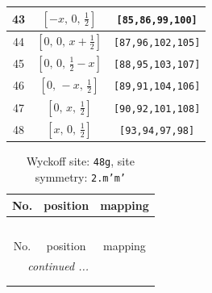 \documentclass[fleqn,8pt]{jsarticle}
\begin{document}
\begin{longtable}{ccc}
43 & $\left[ - x,\, 0,\, \frac{1}{2} \right]$ & {\tt [85,86,99,100]} \\ \hline
44 & $\left[ 0,\, 0,\, x + \frac{1}{2} \right]$ & {\tt [87,96,102,105]} \\ \hline
45 & $\left[ 0,\, 0,\, \frac{1}{2} - x \right]$ & {\tt [88,95,103,107]} \\ \hline
46 & $\left[ 0,\, - x,\, \frac{1}{2} \right]$ & {\tt [89,91,104,106]} \\ \hline
47 & $\left[ 0,\, x,\, \frac{1}{2} \right]$ & {\tt [90,92,101,108]} \\ \hline
48 & $\left[ x,\, 0,\, \frac{1}{2} \right]$ & {\tt [93,94,97,98]} \\
\end{longtable}
\renewcommand{\arraystretch}{1.2}
\begin{longtable}{ccc}
\caption{Wyckoff site: {\tt 48g}, site symmetry: {\tt 2.m'm'}}
 \\
 \hline \hline
No. & position & mapping \\ \hline \endfirsthead

\multicolumn{2}{l}{\tablename\ \thetable{}} \\
 \hline \hline
No. & position & mapping \\ \hline \endhead

 \hline \hline
\multicolumn{2}{r}{\footnotesize\it continued ...} \\ \endfoot

 \hline \hline
\multicolumn{2}{r}{} \\ \endlastfoot


\end{longtable}
\end{document}
